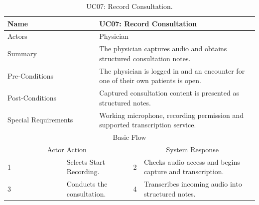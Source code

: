 \begin{table}[htbp]
\centering
\small
\caption{UC07: Record Consultation.}
\label{tab:kashaf:uc07}
\begin{tabular}{|p{}|p{}|p{}|p{}|p{}|}
\hline
\multicolumn{2}{|p{\dimexpr0.225\textwidth+2\tabcolsep+\arrayrulewidth\relax}|}{Name} & \multicolumn{3}{p{\dimexpr0.575\textwidth+4\tabcolsep+2\arrayrulewidth\relax}|}{UC07: Record Consultation} \\ \hline
\multicolumn{2}{|p{\dimexpr0.225\textwidth+2\tabcolsep+\arrayrulewidth\relax}|}{Actors} & \multicolumn{3}{p{\dimexpr0.575\textwidth+4\tabcolsep+2\arrayrulewidth\relax}|}{Physician} \\ \hline
\multicolumn{2}{|p{\dimexpr0.225\textwidth+2\tabcolsep+\arrayrulewidth\relax}|}{Summary} & \multicolumn{3}{p{\dimexpr0.575\textwidth+4\tabcolsep+2\arrayrulewidth\relax}|}{The physician captures audio and obtains structured consultation notes.} \\ \hline
\multicolumn{2}{|p{\dimexpr0.225\textwidth+2\tabcolsep+\arrayrulewidth\relax}|}{Pre-Conditions} & \multicolumn{3}{p{\dimexpr0.575\textwidth+4\tabcolsep+2\arrayrulewidth\relax}|}{The physician is logged in and an encounter for one of their own patients is open.} \\ \hline
\multicolumn{2}{|p{\dimexpr0.225\textwidth+2\tabcolsep+\arrayrulewidth\relax}|}{Post-Conditions} & \multicolumn{3}{p{\dimexpr0.575\textwidth+4\tabcolsep+2\arrayrulewidth\relax}|}{Captured consultation content is presented as structured notes.} \\ \hline
\multicolumn{2}{|p{\dimexpr0.225\textwidth+2\tabcolsep+\arrayrulewidth\relax}|}{Special Requirements} & \multicolumn{3}{p{\dimexpr0.575\textwidth+4\tabcolsep+2\arrayrulewidth\relax}|}{Working microphone, recording permission and supported transcription service.} \\ \hline
\multicolumn{5}{|c|}{Basic Flow} \\ \hline
\multicolumn{3}{|c|}{Actor Action} & \multicolumn{2}{c|}{System Response} \\ \hline
1 & \multicolumn{2}{p{\dimexpr0.37\textwidth+2\tabcolsep+\arrayrulewidth\relax}|}{Selects Start Recording.} & 2 & Checks audio access and begins capture and transcription. \\ \hline
3 & \multicolumn{2}{p{\dimexpr0.37\textwidth+2\tabcolsep+\arrayrulewidth\relax}|}{Conducts the consultation.} & 4 & Transcribes incoming audio into structured notes. \\ \hline

\end{tabular}
\end{table}
